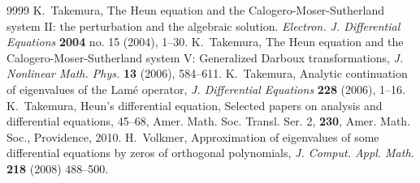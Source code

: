 \documentclass[12pt]{amsart}
\numberwithin{equation}{section}
\theoremstyle{definition}
\theoremstyle{remark}
\begin{document}
\begin{thebibliography}{9999}
K.~Takemura, The Heun equation and the Calogero-Moser-Sutherland system II: the perturbation and the algebraic solution. {\it  Electron. J. Differential Equations} {\bf 2004} no. 15 (2004), 1--30. 
K.~Takemura, The Heun equation and the Calogero-Moser-Sutherland system V: Generalized Darboux transformations, {\it J. Nonlinear Math. Phys.} {\bf 13} (2006), 584--611.
K.~Takemura, Analytic continuation of eigenvalues of the Lam\'e operator, \textit{J. Differential Equations} \textbf{228} (2006), 1--16.
K.~Takemura, Heun's differential equation, Selected papers on analysis and differential equations, 45--68, Amer. Math. Soc. Transl. Ser. 2, {\bf 230}, Amer. Math. Soc., Providence, 2010.
H.~Volkmer, Approximation of eigenvalues of some differential equations by zeros of orthogonal polynomials, \textit{J. Comput. Appl. Math.} \textbf{218} (2008) 488--500.
\end{thebibliography}
\end{document}
